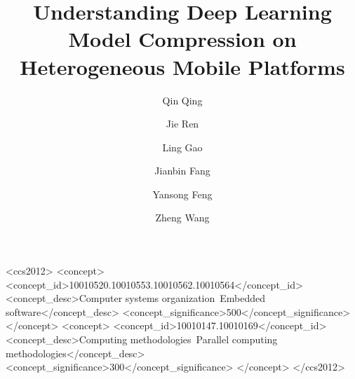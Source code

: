\documentclass[format=acmsmall, review=true , screen=true]{acmart}
\begin{document}
\title{Understanding Deep Learning Model Compression on Heterogeneous Mobile Platforms}






\author{Qin Qing}
\author{Jie Ren}
 
\author{Ling Gao}

\author{Jianbin Fang}

\author{Yansong Feng}

\author{Zheng Wang}


%
%
\begin{CCSXML}
<ccs2012> <concept> <concept_id>10010520.10010553.10010562.10010564</concept_id> <concept_desc>Computer systems organization~Embedded
software</concept_desc> <concept_significance>500</concept_significance> </concept> <concept> <concept_id>10010147.10010169</concept_id>
<concept_desc>Computing methodologies~Parallel computing methodologies</concept_desc> <concept_significance>300</concept_significance>
</concept> </ccs2012>
\end{CCSXML}


 





\maketitle

\renewcommand{\shortauthors}{Q. Qing et al.}











\end{document}
